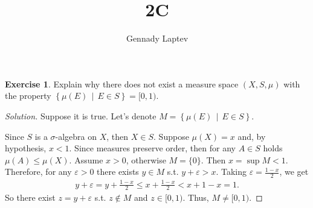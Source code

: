 \documentclass[letterpaper, 12pt, english]{article}
\title{2C}
\author{Gennady Laptev}
\date{}
\theoremstyle{definition}
\theoremstyle{definition}
\newtheorem{problem}{Exercise}
\theoremstyle{definition}
\newenvironment{sol}{\begin{proof}[Solution]}{\end{proof}}
\theoremstyle{plain} %
\theoremstyle{plain} %
\theoremstyle{plain} %
\theoremstyle{plain} %
\theoremstyle{remark}
\begin{document}
\maketitle
\setcounter{section}{0}


\setcounter{problem}{0}
\begin{problem}
Explain why there does not exist a measure space $ (X, S, \mu) $ with the property
$ \left\{ \mu(E) \,\middle|\, E \in S \right\} = [0,1) $.
\begin{sol}
    Suppose it is true. Let's denote $ M =  \left\{ \mu(E) \,\middle|\, E \in S \right\}$.

    Since $ S $ is a $ \sigma $-algebra on $ X $, then $ X \in S $. 
    Suppose $ \mu(X) = x $ and, by hypothesis, $ x < 1 $.
    Since measures preserve order, then for any $ A \in S $ 
    holds $ \mu(A) \leq \mu(X) $.
    Assume $ x > 0 $, otherwise 
    $ M = \{ 0 \} $.
    Then $  x = \sup M < 1$.
    Therefore, for any $ \varepsilon > 0 $ there exists $ y \in M $ 
    s.t. $ y + \varepsilon > x $. Taking $ \varepsilon = \frac{1 - x}{2} $,
    we get
    \begin{gather*}
        y + \varepsilon = y + \frac{1 - x}{2} \leq x + \frac{1 - x}{2} 
        < x + 1 - x = 1.
    \end{gather*}
    So there exist $ z = y + \varepsilon $ s.t. $ z \not \in M $ and $ z \in [0, 1) $.
    Thus, $ M \ne [0,1) $.
\end{sol}
\end{problem}
\end{document}
